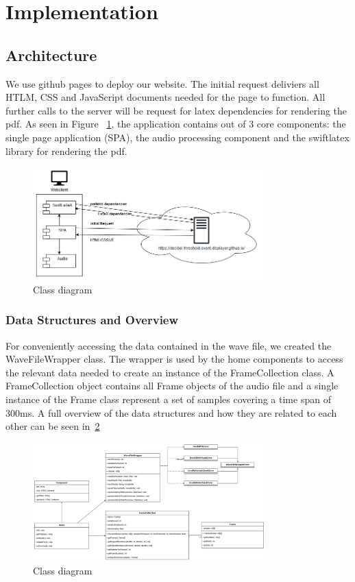 \section{Implementation}\label{sec:implementation}

\subsection{Architecture}\label{subsec:architecture}
We use github pages to deploy our website. The initial request deliviers all HTLM, CSS and JavaScript documents needed for the page to function. All further calls to the server will be request for latex dependencies for rendering the pdf. As seen in Figure ~\ref{fig:high-level-architecture}, the application contains out of 3 core components: the single page application (SPA), the audio processing component and the swiftlatex library for rendering the pdf.

\begin{figure}[H]
    \centering
    \includegraphics[width=0.8\textwidth]{../assets/high_level_architecture.png}
    \caption{Class diagram}\label{fig:high-level-architecture}
\end{figure}

\subsubsection{Data Structures and Overview}
For conveniently accessing the data contained in the wave file, we created the WaveFileWrapper class.
The wrapper is used by the home components to access the relevant data needed to create an instance of the FrameCollection class.
A FrameCollection object contains all Frame objects of the audio file and a single instance of the Frame class represent a set of samples covering a time span of 300ms.
A full overview of the data structures and how they are related to each other can be seen in~\ref{fig:class-diagram}

\begin{figure}[H]
    \centering
    \includegraphics[width=0.8\textwidth]{../assets/class_diagram.png}
    \caption{Class diagram}\label{fig:class-diagram}
\end{figure}

